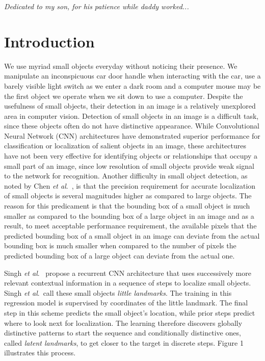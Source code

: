 \documentclass [11pt,letterpaper ,openany ]{report}
\begin{document}
    \tableofcontents
    \listoffigures
    \listoftables

    \newpage
    \begin{center}
      \Large
      \vspace*{\fill}
      \textit{Dedicated to my son, for his patience while daddy worked...}
      \vspace*{\fill}
    \end{center}    


    \chapter{Introduction}
    \doublespacing
    We use myriad small objects everyday without noticing their presence. We manipulate an inconspicuous car door handle when interacting with the car, use a barely visible light switch as we enter a dark room and a computer mouse may be the first object we operate when we sit down to use a computer. Despite the usefulness of small objects, their detection in an image is a relatively unexplored area in computer vision. Detection of small objects in an image is a difficult task, since these objects often do not have distinctive appearance. While Convolutional Neural Network (CNN) architectures have demonstrated superior performance for classification or localization of salient objects in an image, these architectures have not been very effective for identifying objects or relationships that occupy a small part of an image, since low resolution of small objects provide weak signal to the network for recognition. Another difficulty in small object detection, as noted by Chen \textit{et al}.\ \cite{chen2016r}, is that the precision requirement for accurate localization of small objects is several magnitudes higher as compared to large objects. The reason for this predicament is that the bounding box of a small object is much smaller as compared to the bounding box of a large object in an image and as a result, to meet acceptable performance requirement, the available pixels that the predicted bounding box of a small object in an image can deviate from the actual bounding box is much smaller when compared to the number of pixels the predicted bounding box of a large object can deviate from the actual one.

    Singh \textit{et al}.\ \cite{Singh_2016_CVPR} propose a recurrent CNN architecture that uses successively more relevant contextual information in a sequence of steps to localize small objects. Singh \textit{et al}.\ call these small objects \textit{little landmarks}. The training in this regression model is supervised by coordinates of the little landmark. The final step in this scheme predicts the small object's location, while prior steps predict where to look next for localization. The learning therefore discovers globally distinctive patterns to start the sequence and conditionally distinctive ones, called \textit {latent landmarks}, to get closer to the target in discrete steps. Figure 1 illustrates this process.
\end{document}
